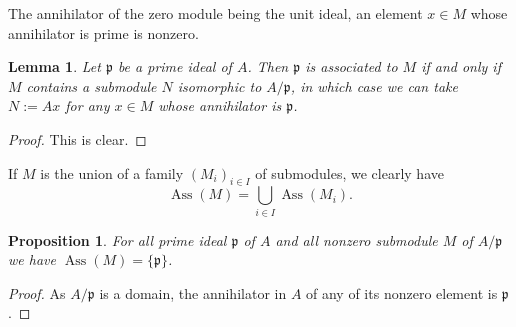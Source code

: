 \documentclass[parskip=half,fontsize=12pt]{scrartcl}%
\newcommand{\oo}{\operatorname}\newcommand{\ooo}{\operatorname*}
\newcommand{\mf}{\mathfrak}
\newcommand{\ppp}{\mf p}
\newcommand{\Ass}{\oo{Ass}}
\newtheorem{lem}[thm]{Lemma}
\newtheorem{prop}[thm]{Proposition}
\begin{document}
The annihilator of the zero module being the unit ideal, an element $x\in M$ whose annihilator is prime is nonzero. 

\begin{lem}\label{ail0}
Let $\ppp$ be a prime ideal of $A$. Then $\ppp$ is associated to $M$ if and only if $M$ contains a submodule $N$ isomorphic to $A/\ppp$, in which case we can take $N:=Ax$ for any $x\in M$ whose annihilator is $\ppp$. 
\end{lem}
\begin{proof}
This is clear.
\end{proof}

If $M$ is the union of a family $(M_i)_{i\in I}$ of submodules, we clearly have
\begin{equation}\label{ai1}
\Ass(M)=\bigcup_{i\in I}\Ass(M_i).
\end{equation}

\begin{prop}\label{aip1}
For all prime ideal $\ppp$ of $A$ and all nonzero submodule $M$ of $A/\ppp$ we have $\Ass(M)=\{\ppp\}$. 
\end{prop}
\begin{proof}
As $A/\ppp$ is a domain, the annihilator in $A$ of any of its nonzero element is $\ppp$.
\end{proof}
\end{document}
